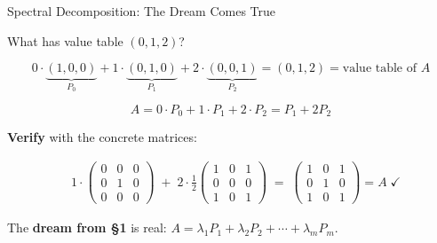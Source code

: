 \documentclass[10pt]{beamer}
\theoremstyle{definition}
\newcommand{\x}[1]{\alert{\textbf{#1}}}
\begin{document}
%
\begin{frame}{Spectral Decomposition: The Dream Comes True}

What has value table $(0, 1, 2)$?

\vfill

$$0 \cdot \underbrace{(1,0,0)}_{P_0} + 1 \cdot \underbrace{(0,1,0)}_{P_1} + 2 \cdot \underbrace{(0,0,1)}_{P_2} = (0,1,2) = \text{value table of } A$$

\vfill

$$\boxed{A = 0 \cdot P_0 + 1 \cdot P_1 + 2 \cdot P_2 = P_1 + 2P_2}$$

\vfill\pause

\textbf{Verify} with the concrete matrices:

\begin{align*}
&1\!\cdot\!\begin{pmatrix}0&0&0\\0&1&0\\0&0&0\end{pmatrix} \;+\; 2\!\cdot\!\frac{1}{2}\begin{pmatrix}1&0&1\\0&0&0\\1&0&1\end{pmatrix}
\;=\; \begin{pmatrix}1&0&1\\0&1&0\\1&0&1\end{pmatrix} = A \;\checkmark
\end{align*}

\vfill

The \x{dream from \S 1} is real: $A = \lambda_1 P_1 + \lambda_2 P_2 + \cdots + \lambda_m P_m$.

\end{frame}
\end{document}

